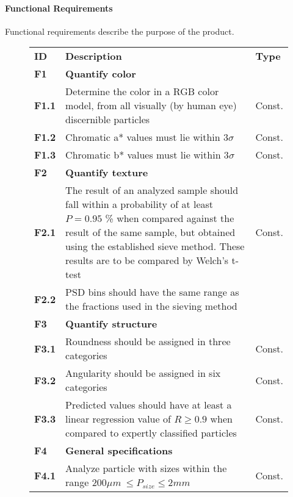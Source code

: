 \documentclass[11pt,fleqn,,a4paper,twoside,openright]{book}
\begin{document}
\paragraph{Functional Requirements}
Functional requirements describe the purpose of the product.
\begin{figure}[h]
	\begin{tabular}{|p{1cm}| p{10cm} p{1.5cm}|}
		\rowcolor{ocre}
		\hline \textbf{ID} & \textbf{Description} & \textbf{Type} \\ 
		\rowcolor{bananamania}
		\hline \textbf{F1}\label{F1} & \textbf{Quantify color} &  \\ 
		\hline \textbf{F1.1}\label{F1.1} & Determine the color in a RGB color model, from all visually (by human eye) discernible particles & Const. \\ 
		\hline \textbf{F1.2}\label{F1.2} & Chromatic a* values must lie within $3 \sigma$ & Const. \\ 
		\hline \textbf{F1.3}\label{F1.3} & Chromatic b* values must lie within $3 \sigma$ & Const. \\ 
		\rowcolor{bananamania}
		\hline \textbf{F2}\label{F2} & \textbf{Quantify texture} &  \\ 
		\hline \textbf{F2.1}\label{F2.1} & The result of an analyzed sample should fall within a probability of at least $P = 0.95$ \% when compared against the result of the same sample, but obtained using the established sieve method. These results are to be compared by Welch's t-test  &  Const. \\ 
		\hline \textbf{F2.2}\label{F2.2} & PSD bins should have the same range as the fractions used in the sieving method & \\
		\rowcolor{bananamania}
		\hline \textbf{F3}\label{F3} & \textbf{Quantify structure}  &  \\ 
		\hline \textbf{F3.1}\label{F3.1} & Roundness should be assigned in three categories  & Const. \\ 
		\hline \textbf{F3.2}\label{F3.2} & Angularity should be assigned in six categories  & Const. \\ 
		\hline \textbf{F3.3}\label{F3.3} & Predicted values should have at least a linear regression value of $ R \geq 0.9 $ when compared to expertly classified particles & Const.  \\ 
		\rowcolor{bananamania}
		\hline \textbf{F4}\label{F4} & \textbf{General specifications} &  \\ 
		\hline \textbf{F4.1}\label{F4.1} & Analyze particle with sizes within the range $ 200 \mu m\ \leq P_{size} \leq 2 mm $& Const. \\ 

\end{tabular}
\end{figure}
\end{document}

